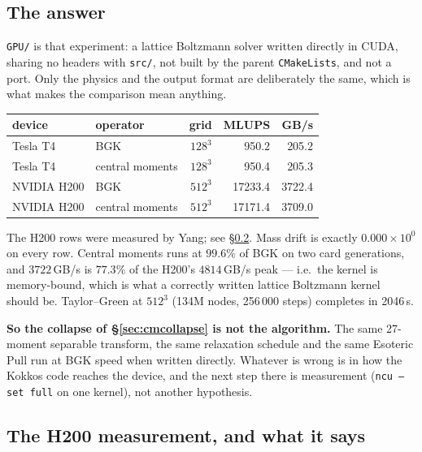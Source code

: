 \documentclass[11pt,a4paper]{article}
\newcommand{\code}[1]{\texttt{\small #1}}
\newcommand{\e}[1]{\times 10^{#1}}
\begin{document}
\subsection{The answer}

\code{GPU/} is that experiment: a lattice Boltzmann solver written directly in
CUDA, sharing no headers with \code{src/}, not built by the parent
\code{CMakeLists}, and not a port. Only the physics and the output format are
deliberately the same, which is what makes the comparison mean anything.

\begin{center}\small
\begin{tabular}{llrrr}
\toprule
device & operator & grid & MLUPS & GB/s \\
\midrule
Tesla T4  & BGK             & $128^3$ & 950.2  & 205.2 \\
Tesla T4  & central moments & $128^3$ & 950.4  & 205.3 \\
NVIDIA H200 & BGK             & $512^3$ & 17233.4 & 3722.4 \\
NVIDIA H200 & central moments & $512^3$ & 17171.4 & 3709.0 \\
\bottomrule
\end{tabular}
\end{center}

\noindent The H200 rows were measured by Yang; see \S\ref{sec:h200}. Mass drift
is exactly $0.000\e{0}$ on every row. Central moments runs
at $99.6\%$ of BGK on two card generations, and $3722$\,GB/s is $77.3\%$ of the
H200's $4814$\,GB/s peak --- i.e.\ the kernel is memory-bound, which is what a
correctly written lattice Boltzmann kernel should be. Taylor--Green at $512^3$
(134M nodes, 256\,000 steps) completes in 2046\,s.

\textbf{So the collapse of \S\ref{sec:cmcollapse} is not the algorithm.} The same
27-moment separable transform, the same relaxation schedule and the same Esoteric
Pull run at BGK speed when written directly. Whatever is wrong is in how the
Kokkos code reaches the device, and the next step there is measurement
(\code{ncu --set full} on one kernel), not another hypothesis.

\subsection{\texorpdfstring{\color{h200red}}{}The H200 measurement, and what it says}
\label{sec:h200}
\end{document}
